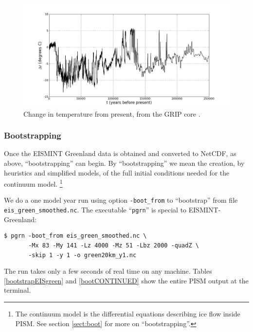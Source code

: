 \documentclass[11pt,final]{amsart}
\begin{document}
\begin{figure}[ht]
\includegraphics[width=5.6in,keepaspectratio=true]{figs/gripDeltaT}
\caption{Change in temperature from present, from the GRIP core \cite{JohnsenetalGRIP}.}
\label{fig:gripDeltaT}
\end{figure}


\subsubsection*{Bootstrapping}  \label{sect:green-bootstrapping}  Once the EISMINT Greenland data is obtained and converted to NetCDF, as above, ``bootstrapping'' can begin.  By ``bootstrapping'' we mean the creation, by heuristics and simplified models, of the full initial conditions needed for the continuum model.  \footnote{The continuum model is the differential equations describing ice flow inside PISM.  See section \ref{sect:boot} for more on ``bootstrapping''.}

We do a one model year run using option \verb|-boot_from| to ``bootstrap'' from file \verb|eis_green_smoothed.nc|.  The executable ``\verb|pgrn|'' is special to EISMINT-Greenland:
\begin{verbatim}
$ pgrn -boot_from eis_green_smoothed.nc \
       -Mx 83 -My 141 -Lz 4000 -Mz 51 -Lbz 2000 -quadZ \
       -skip 1 -y 1 -o green20km_y1.nc
\end{verbatim}
\noindent The run takes only a few seconds of real time on any machine.  Tables \ref{bootstrapEISgreen} and \ref{bootCONTINUED} show the entire PISM output at the terminal.
\end{document}
